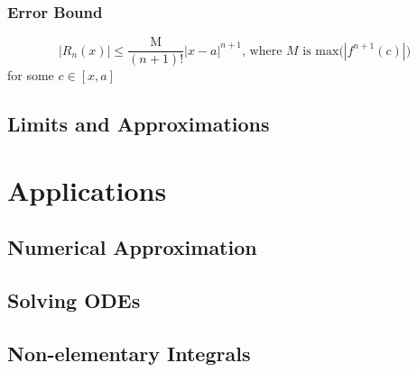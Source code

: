 \documentclass[11pt]{article}
\begin{document}
\subsubsection*{Error Bound}
\[
  |R_n(x)| \le \frac{\text{M}}{(n+1)!} |x-a|^{n+1}\text{, where }M\text{ is max(}|f^{n+1}(c)|\text{)}
\]for some $c\in[x,a]$
\subsection{Limits and Approximations}
\section{Applications}
\subsection{Numerical Approximation}
\subsection{Solving ODEs}
\subsection{Non-elementary Integrals}
\end{document}
